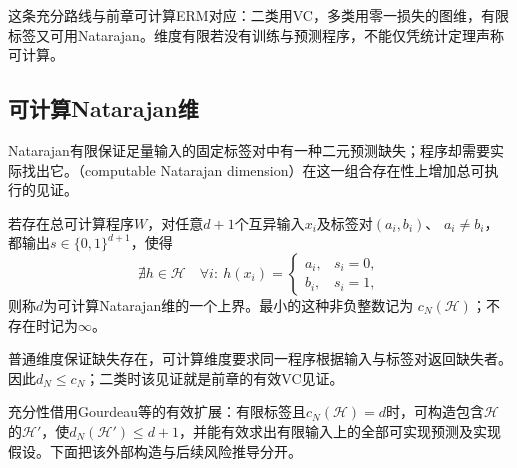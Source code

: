 这条充分路线与前章可计算ERM对应：二类用VC，多类用零一损失的图维，有限标签又可用Natarajan。维度有限若没有训练与预测程序，不能仅凭统计定理声称可计算。

\subsection{可计算Natarajan维}

Natarajan有限保证足量输入的固定标签对中有一种二元预测缺失；程序却需要实际找出它。（computable Natarajan dimension）在这一组合存在性上增加总可执行的见证。

\begin{definition}[可计算Natarajan维]
\label{def:computable-natarajan-dimension}
若存在总可计算程序$W$，对任意$d+1$个互异输入$x_i$及标签对$(a_i,b_i)$、
$a_i\neq b_i$，都输出$s\in\{0,1\}^{d+1}$，使得
\[
 \nexists h\in\mathcal H\quad
 \forall i:\ h(x_i)=\begin{cases}a_i,&s_i=0,\\b_i,&s_i=1,\end{cases}
\]
则称$d$为可计算Natarajan维的一个上界。最小的这种非负整数记为
$c_N(\mathcal H)$；不存在时记为$\infty$。
\end{definition}

普通维度保证缺失存在，可计算维度要求同一程序根据输入与标签对返回缺失者。因此$d_N\leq c_N$；二类时该见证就是前章的有效VC见证。

充分性借用Gourdeau等的有效扩展：有限标签且$c_N(\mathcal H)=d$时，可构造包含$\mathcal H$的$\mathcal H'$，使$d_N(\mathcal H')\leq d+1$，并能有效求出有限输入上的全部可实现预测及实现假设。下面把该外部构造与后续风险推导分开。

